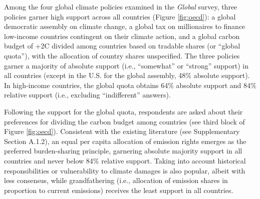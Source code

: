 Among the four global climate policies examined in the \textit{Global} survey, three policies garner high support across all countries (Figure \ref{fig:oecd}): a global democratic assembly on climate change, a global tax on millionaires to finance low-income countries contingent on their climate action, and a global carbon budget of +2\textdegree{}C divided among countries based on tradable shares (or ``global quota''), with the allocation of country shares unspecified. %
The three policies garner a majority of absolute support (i.e., ``somewhat'' or ``strong'' support) in all countries (except in the U.S. for the global assembly, 48\% absolute support). In high-income countries, the global quota obtains 64\% absolute support and 84\% relative support (i.e., excluding ``indifferent'' answers). 

Following the support for the global quota, respondents are asked about their preferences for dividing the carbon budget among countries (see third block of Figure \ref{fig:oecd}). Consistent with the existing literature (see Supplementary Section A.1.2), an equal per capita allocation of emission rights emerges as the preferred burden-sharing principle, garnering absolute majority support in all countries and never below 84\% relative support. Taking into account historical responsibilities or vulnerability to climate damages is also popular, albeit with less consensus, while grandfathering (i.e., allocation of emission shares in proportion to current emissions) receives the least support in all countries.

